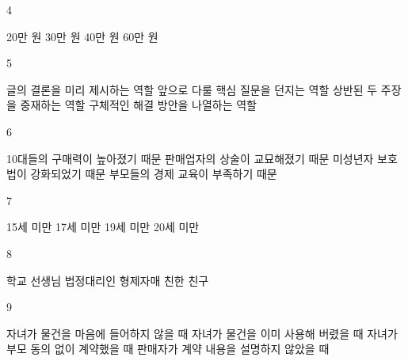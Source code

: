 \documentclass[fs9,seriesRus]{korfarm-base}
\begin{document}
\begin{kfSentenceUnit}{4}{}
\begin{kfChoices}
\kfChoice 20만 원
\kfChoice 30만 원
\kfChoice 40만 원
\kfChoice 60만 원
\end{kfChoices}
\end{kfSentenceUnit}

\begin{kfSentenceUnit}{5}{}
\begin{kfChoices}
\kfChoice 글의 결론을 미리 제시하는 역할
\kfChoice 앞으로 다룰 핵심 질문을 던지는 역할
\kfChoice 상반된 두 주장을 중재하는 역할
\kfChoice 구체적인 해결 방안을 나열하는 역할
\end{kfChoices}
\end{kfSentenceUnit}

\begin{kfSentenceUnit}{6}{}
\begin{kfChoices}
\kfChoice 10대들의 구매력이 높아졌기 때문
\kfChoice 판매업자의 상술이 교묘해졌기 때문
\kfChoice 미성년자 보호법이 강화되었기 때문
\kfChoice 부모들의 경제 교육이 부족하기 때문
\end{kfChoices}
\end{kfSentenceUnit}

\begin{kfSentenceUnit}{7}{}
\begin{kfChoices}
\kfChoice 15세 미만
\kfChoice 17세 미만
\kfChoice 19세 미만
\kfChoice 20세 미만
\end{kfChoices}
\end{kfSentenceUnit}

\begin{kfSentenceUnit}{8}{}
\begin{kfChoices}
\kfChoice 학교 선생님
\kfChoice 법정대리인
\kfChoice 형제자매
\kfChoice 친한 친구
\end{kfChoices}
\end{kfSentenceUnit}

\begin{kfSentenceUnit}{9}{}
\begin{kfChoices}
\kfChoice 자녀가 물건을 마음에 들어하지 않을 때
\kfChoice 자녀가 물건을 이미 사용해 버렸을 때
\kfChoice 자녀가 부모 동의 없이 계약했을 때
\kfChoice 판매자가 계약 내용을 설명하지 않았을 때
\end{kfChoices}
\end{kfSentenceUnit}
\end{document}
